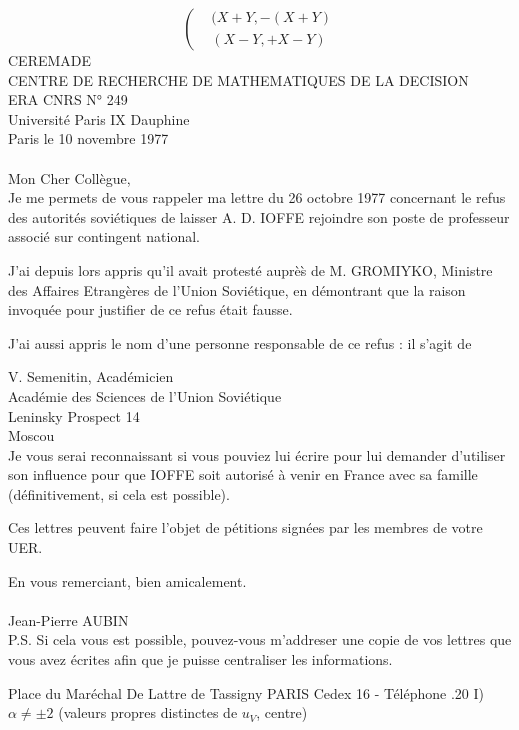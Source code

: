 \[
\left(\begin{aligned}
&(X+Y,-(X+Y)\\
&(X-Y,+X-Y)
\end{aligned}\right.
\]
CEREMADE\\
CENTRE DE RECHERCHE DE MATHEMATIQUES DE LA DECISION\\
ERA \quad CNRS \quad N° 249\\
Université Paris IX Dauphine\\
Paris\unsure{\textasciidieresis|\textquotedbl} le 10 novembre 1977\\
\\

Mon Cher Collègue,\\

Je me permets de vous rappeler ma lettre du 26 octobre 1977 concernant le refus des autorités soviétiques de laisser A. D. IOFFE rejoindre son poste de professeur associé sur contingent national.

J'ai depuis lors appris qu'il avait protesté auprè\`{s} de M. GROMIYKO, Ministre des Affaires Etrangères de l'Union Soviétique, en démontrant que la raison invoquée pour justifier de ce refus était fausse.

J'ai aussi appris le nom d'une personne responsable de ce refus : il s'agit de

V. Semenitin, Académicien\\
Académie des Sciences de l'Union Soviétique\\
Leninsky Prospect 14\\
Moscou\\

Je vous serai reconnaissant si vous pouviez lui écrire pour lui demander d'utiliser son influence pour que IOFFE soit autorisé à venir en France avec sa famille (définitivement, si cela est possible).

Ces lettres peuvent faire l'objet de pétitions signées par les membres de votre UER.

En vous remerciant, bien amicalement.\\
\\
Jean-Pierre AUBIN\\

P.S. Si cela vous est possible, pouvez-vous m'addreser une copie de vos lettres que vous avez écrites afin que je puisse centraliser les informations.

Place du Maréchal De Lattre de Tassigny  PARIS Cedex 16 - Téléphone .20
I) $\alpha\ne\pm2$ \quad (valeurs propres distinctes de $u_V$,  centre)

